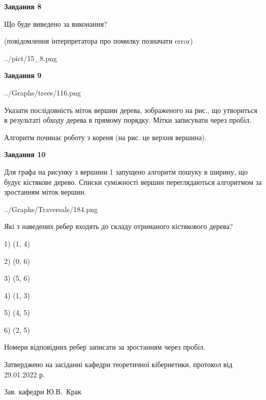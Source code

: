 \documentclass[12pt, ukrainian]{article}
\begin{document}
{\begin {large}
{\begin {center}\textbf{Завдання 8}\end {center}}\par
Що буде виведено за виконання?\par
 (повідомлення інтерпретатора про помилку позначати error)\par
\begin{center}
	{../pict/15_8.png}
\end{center}
\newpage

{\begin {center}\textbf{Завдання 9}\end {center}}\par

\begin{center}
	{../Graphs/trees/116.png}
\end{center}
Указати послідовність міток вершин дерева, зображеного на рис., що утвориться в результаті обходу дерева в прямому порядку. Мітки записувати через пробіл.\par Алгоритм починає роботу з кореня (на рис. це верхня вершина).\par
\newpage

{\begin {center}\textbf{Завдання 10}\end {center}}\par
Для графа на рисунку з вершини 1 запущено алгоритм пошуку в ширину, що будує кістякове дерево. Списки суміжності вершин переглядаються алгоритмом за зростанням міток вершин.\par
\begin{center}
	{../Graphs/Traversals/184.png}
\end{center}
\par Які з наведених ребер входять до складу отриманого кістякового дерева?\par
1) (1, 4)\par
2) (0, 6)\par
3) (5, 6)\par
4) (1, 3)\par
5) (4, 5)\par
6) (2, 5)\par
{\vskip 15pt} Номери відповідних ребер записати за зростанням через пробіл.\par
\newpage


\end {large}
}
{\smallskip \begin {small} Затверджено на засіданні кафедри теоретичної кібернетики, протокол  від   29.01.2022 р.\par\smallskip\smallskip
{\parbox {6.5 cm}{Зав. кафедри \dotfill Ю.В.~Крак}} \end{small}}
\end{document}
